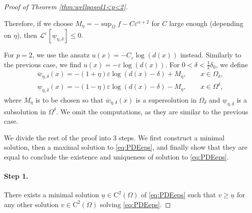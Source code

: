 \documentclass[11pt,reqno]{amsart}
\numberwithin{figure}{section}
\theoremstyle{plain}
\theoremstyle{remark}
\numberwithin{equation}{section}
\begin{document}
\begin{appendices}
\begin{proof} [Proof of Theorem \ref{thm:wellposed1<p<2}]
\begin{itemize}
\begin{equation*}
    \end{equation*}
     Therefore, if we choose $M_\eta = -\sup_{\overline{\Omega}} f - C\varepsilon^{\alpha+2}$ for $C$ large enough (depending on $\eta$), then $\mathcal{L}^\varepsilon\left[\underline{w}_{\eta,\delta}\right]\leq 0$.
\end{itemize}
For $p=2$, we use the ansatz $u(x) = -C_\varepsilon \log(d(x))$ instead. Similarly to the previous case, we find $u(x) = -\varepsilon\log(d(x))$. For $0<\delta<\frac{1}{2}\delta_0$, we define 
\begin{equation*}
    \begin{split}
        &\overline{w}_{\eta,\delta}(x) = -(1+\eta)\varepsilon\log(d(x)-\delta) + M_\eta, \qquad x\in \Omega_\delta,\\
        &\underline{w}_{\eta,\delta}(x) = -(1-\eta)\varepsilon\log(d(x)-\delta) - M_\eta, \qquad x\in \Omega^\delta,
    \end{split}
\end{equation*}
where $M_\eta$ is to be chosen so that $\overline{w}_{\eta,\delta}(x)$ is a supersolution in $\Omega_\delta$ and $\underline{w}_{\eta,\delta}$ is a subsolution in $\Omega^\delta$. We omit the computations, as they are similar to the previous case.
\smallskip

\noindent We divide the rest of the proof into 3 steps. We first construct a minimal solution, then a maximal solution to \eqref{eq:PDEeps}, and finally show that they are equal to conclude the existence and uniqueness of solution to \eqref{eq:PDEeps}.
\smallskip

\paragraph{\textbf{Step 1.}} There exists a minimal solution $\underline{u}\in \mathrm{C}^2(\Omega)$ of \eqref{eq:PDEeps} such that $v\geq \underline{u}$ for any other solution $v\in \mathrm{C}^2(\Omega)$ solving \eqref{eq:PDEeps}.


\end{proof}
\end{appendices}
\end{document}
